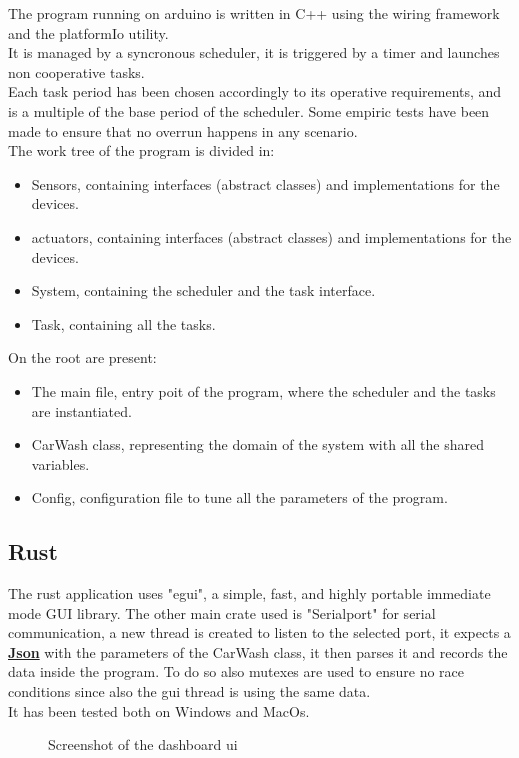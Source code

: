 The program running on arduino is written in C++ using the wiring framework and the platformIo utility.\\
It is managed by a syncronous scheduler, it is triggered by a timer and launches non cooperative tasks.\\
Each task period has been chosen accordingly to its operative requirements, and is a multiple of the base period of the scheduler.
Some empiric tests have been made to ensure that no overrun happens in any scenario.\\
The work tree of the program is divided in:
\begin{itemize}
    \item Sensors, containing interfaces (abstract classes) and implementations for the devices.
    \item actuators, containing interfaces (abstract classes) and implementations for the devices.
    \item System, containing the scheduler and the task interface.
    \item Task, containing all the tasks.
\end{itemize}
On the root are present:
\begin{itemize}
    \item The main file, entry poit of the program, where the scheduler and the tasks are instantiated.
    \item CarWash class, representing the domain of the system with all the shared variables.
    \item Config, configuration file to tune all the parameters of the program.
\end{itemize}
\pagebreak
\subsection{Rust}
The rust application uses "egui", a simple, fast, and highly portable immediate mode GUI library.
The other main crate used is "Serialport" for serial communication, a new thread is created to listen to the selected port,
it expects a \underline{\textbf{Json}} with the parameters of the CarWash class, it then parses it and records the data inside the program.
To do so also mutexes are used to ensure no race conditions since also the gui thread is using the same data.\\
It has been tested both on Windows and MacOs.
\begin{figure}[H]
    \centering
    \caption{Screenshot of the dashboard ui}
\end{figure}

